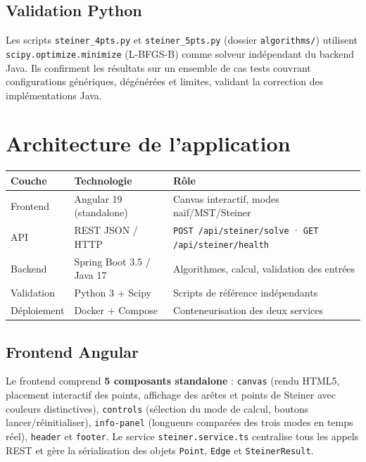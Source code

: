 \documentclass[11pt, a4paper]{article}
\begin{document}
\subsection{Validation Python}

Les scripts \texttt{steiner\_4pts.py} et \texttt{steiner\_5pts.py} (dossier \texttt{algorithms/})
utilisent \texttt{scipy.optimize.minimize} (L-BFGS-B) comme solveur indépendant du backend Java.
Ils confirment les résultats sur un ensemble de cas tests couvrant configurations génériques,
dégénérées et limites, validant la correction des implémentations Java.

\section{Architecture de l'application}

\begin{center}
\small\setlength{\tabcolsep}{5pt}
\begin{tabular}{@{}lll@{}}
\toprule
\rowcolor{violetClair}
\textbf{Couche} & \textbf{Technologie} & \textbf{Rôle} \\
\midrule
Frontend    & Angular 19 (standalone) & Canvas interactif, modes naïf/MST/Steiner \\
API         & REST JSON / HTTP        & \texttt{POST /api/steiner/solve} · \texttt{GET /api/steiner/health} \\
Backend     & Spring Boot 3.5 / Java 17 & Algorithmes, calcul, validation des entrées \\
Validation  & Python 3 + Scipy        & Scripts de référence indépendants \\
Déploiement & Docker + Compose        & Conteneurisation des deux services \\
\bottomrule
\end{tabular}
\end{center}

\subsection{Frontend Angular}

Le frontend comprend \textbf{5 composants standalone} :
\texttt{canvas} (rendu HTML5, placement interactif des points, affichage des arêtes et
points de Steiner avec couleurs distinctives),
\texttt{controls} (sélection du mode de calcul, boutons lancer/réinitialiser),
\texttt{info-panel} (longueurs comparées des trois modes en temps réel),
\texttt{header} et \texttt{footer}.
Le service \texttt{steiner.service.ts} centralise tous les appels REST et gère la
sérialisation des objets \texttt{Point}, \texttt{Edge} et \texttt{SteinerResult}.
\end{document}
